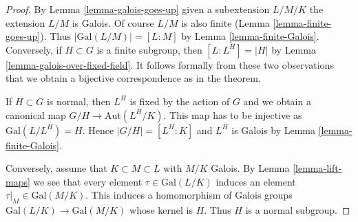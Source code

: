 \documentclass[10pt,a4paper]{amsart}
\theoremstyle{plain}
\theoremstyle{definition}
\theoremstyle{remark}
\numberwithin{equation}{subsection}
\begin{document}
\begin{proof}
By Lemma \ref{lemma-galois-goes-up} given a subextension $L/M/K$
the extension $L/M$ is Galois. Of course $L/M$ is also finite
(Lemma \ref{lemma-finite-goes-up}). Thus $|\text{Gal}(L/M)| = [L : M]$
by Lemma \ref{lemma-finite-Galois}.
Conversely, if $H \subset G$ is a finite subgroup, then
$[L : L^H] = |H|$ by Lemma \ref{lemma-galois-over-fixed-field}.
It follows formally from these two observations that we obtain
a bijective correspondence as in the theorem.

\medskip\noindent
If $H \subset G$ is normal, then $L^H$ is fixed by the action of
$G$ and we obtain a canonical map $G/H \to \text{Aut}(L^H/K)$.
This map has to be injective as $\text{Gal}(L/L^H) = H$. Hence
$|G/H| = [L^H : K]$ and $L^H$ is Galois by
Lemma \ref{lemma-finite-Galois}.

\medskip\noindent
Conversely, assume that $K \subset M \subset L$ with $M/K$ Galois.
By Lemma \ref{lemma-lift-maps} we see that every
element $\tau \in \text{Gal}(L/K)$ induces an element
$\tau|_M \in \text{Gal}(M/K)$. This induces a homomorphism
of Galois groups $\text{Gal}(L/K) \to \text{Gal}(M/K)$ whose
kernel is $H$. Thus $H$ is a normal subgroup.
\end{proof}
\end{document}
